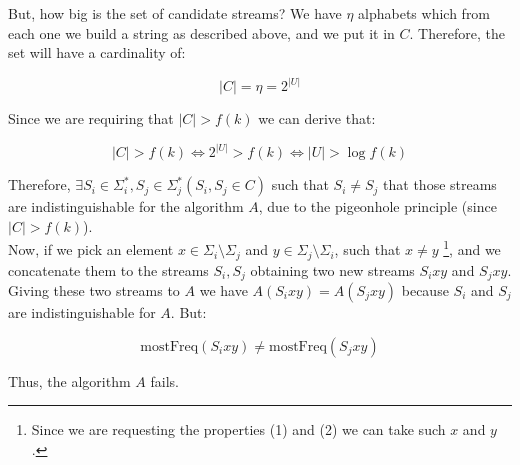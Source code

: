 \documentclass{article}
\begin{document}
\noindent But, how big is the set of candidate streams? We have $\eta$ alphabets which from each one we build a string as described above, and we put it in $C$.
Therefore, the set will have a cardinality of:

\begin{equation*}
    |C| = \eta = 2^{|U|}
\end{equation*}

\noindent Since we are requiring that $|C| > f(k)$ we can derive that:

\begin{equation*}
    |C| > f(k) \iff 2^{|U|} > f(k) \iff |U| > \log{f(k)}
\end{equation*}

\noindent Therefore, $\exists S_i \in \Sigma_{i}^*, S_j \in \Sigma_{j}^{*} (S_i, S_j \in C)$ such that $S_i \ne S_j $ that those streams are indistinguishable for the algorithm $A$, due to the pigeonhole principle (since $|C| > f(k)$).\\

\noindent Now, if we pick an element $x \in \Sigma_i \setminus \Sigma_j$ and $y \in \Sigma_j \setminus \Sigma_i$, such that $x \ne y$ \footnote{Since we are requesting the properties (1) and (2) we can take such $x$ and $y$.}, and we concatenate them to 
the streams $S_i, S_j$ obtaining two new streams $S_ixy$ and $S_jxy$. Giving these two streams to $A$ we have $A(S_i xy) = A(S_j xy)$ because $S_i$ and $S_j$ are
indistinguishable for $A$. But:

\begin{equation*}
    \textrm{mostFreq}(S_i xy) \ne \textrm{mostFreq}(S_j xy)
\end{equation*}

\noindent Thus, the algorithm $A$ fails.
\end{document}
